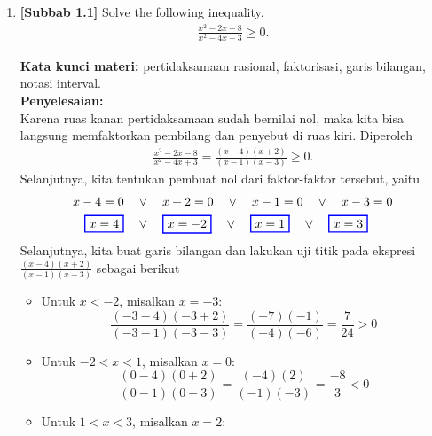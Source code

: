 \documentclass[10pt,openany,a4paper]{article}
\theoremstyle{definition}
\theoremstyle{definition}
\theoremstyle{plain}
\newenvironment{jawab}[2][tes]{%
\par\noindent\textbf{Kata kunci materi:} #1.\\
\textbf{Penyelesaian:} #2%
}{}
\begin{document}
\begin{enumerate}
    \item \textbf{[Subbab 1.1]} Solve the following inequality.
    \begin{align*}
        \frac{x^2-2x-8}{x^2-4x+3}\geq 0.
    \end{align*}
    \begin{jawab}[pertidaksamaan rasional, faktorisasi, garis bilangan, notasi interval]{~\\
    Karena ruas kanan pertidaksamaan sudah bernilai nol, maka kita bisa langsung memfaktorkan pembilang dan penyebut di ruas kiri. Diperoleh
    \begin{align*}
        \frac{x^2-2x-8}{x^2-4x+3} = \frac{(x-4)(x+2)}{(x-1)(x-3)} \geq 0.
    \end{align*}
    Selanjutnya, kita tentukan pembuat nol dari faktor-faktor tersebut, yaitu
    \begin{align*}
        x-4 = 0 \quad &\vee\quad x+2 = 0 \quad \vee\quad x-1 = 0 \quad \vee\quad x-3 = 0\\
        \colorlet{oldcolor}{.}
        \color{blue}
        \setlength{\fboxrule}{1pt} \boxed{\color{oldcolor}x=4}\color{oldcolor} \quad &\vee\quad \colorlet{oldcolor}{.}
        \color{blue}
        \setlength{\fboxrule}{1pt} \boxed{\color{oldcolor}x=-2}\color{oldcolor} \quad \vee\quad \colorlet{oldcolor}{.}
        \color{blue}
        \setlength{\fboxrule}{1pt} \boxed{\color{oldcolor}x=1}\color{oldcolor} \quad \vee\quad \colorlet{oldcolor}{.}
        \color{blue}
        \setlength{\fboxrule}{1pt} \boxed{\color{oldcolor}x=3}\color{oldcolor}
    \end{align*}
    Selanjutnya, kita buat garis bilangan dan lakukan uji titik pada ekspresi \(\frac{(x-4)(x+2)}{(x-1)(x-3)}\) sebagai berikut
    \begin{itemize}
        \item Untuk \(x < -2\), misalkan \(x = -3\):
        \[
        \frac{(-3-4)(-3+2)}{(-3-1)(-3-3)} = \frac{(-7)(-1)}{(-4)(-6)} = \frac{7}{24} > 0
        \]
        \item Untuk \(-2 < x < 1\), misalkan \(x = 0\):
        \[
        \frac{(0-4)(0+2)}{(0-1)(0-3)} = \frac{(-4)(2)}{(-1)(-3)} = \frac{-8}{3} < 0
        \]
        \item Untuk \(1 < x < 3\), misalkan \(x = 2\):

\end{itemize}}
\end{jawab}
\end{enumerate}
\end{document}
